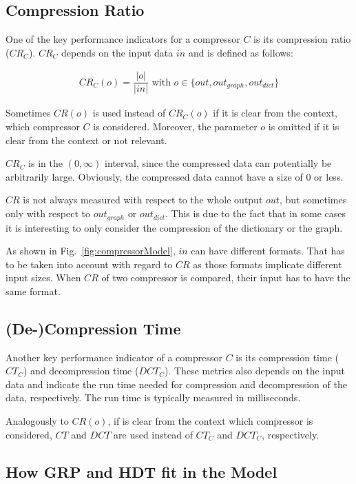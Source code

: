 \subsection{Compression Ratio}

One of the key performance indicators for a compressor $C$ is its compression ratio ($CR_C$). $CR_C$ depends on the input data $in$ and is defined as follows:

\begin{align*}
CR_{C}(o) = \dfrac{|o|}{ |in|}  \text{ with } o\in \{out,out_{graph},out_{dict} \}
\end{align*}

Sometimes $CR(o)$ is used instead of $CR_C(o)$ if it is clear from the context, which compressor $C$ is considered. Moreover, the parameter $o$ is omitted if it is clear from the context or not relevant.

$CR_C$  is in the $(0,\infty)$ interval, since the compressed data can potentially be arbitrarily large. Obviously, the compressed data cannot have a size of 0 or less.

$CR$ is not always measured with respect to the whole output $out$, but sometimes only with respect to $out_{graph} \text{ or } out_{dict}$. This is due to the fact that in some cases it is interesting to only consider the compression of the dictionary or the graph.

As shown in Fig.~\ref{fig:compressorModel}, $in$ can have different formats. That has to be taken into account with regard to $CR$ as those formats implicate different input sizes. When $CR$ of two compressor is compared, their input has to have the same format.

\subsection{(De-)Compression Time}

Another key performance indicator of a compressor $C$ is its compression time ($CT_C$) and decompression time ($DCT_C$). These metrics also depends on the input data and indicate the run time needed for compression and decompression of the data, respectively. The run time is typically measured in milliseconds.

Analogously to $CR(o)$, if is clear from the context which compressor is considered, $CT$ and $DCT$ are used instead of $CT_C$ and $DCT_C$, respectively.

\subsection{How GRP and HDT fit in the Model}

